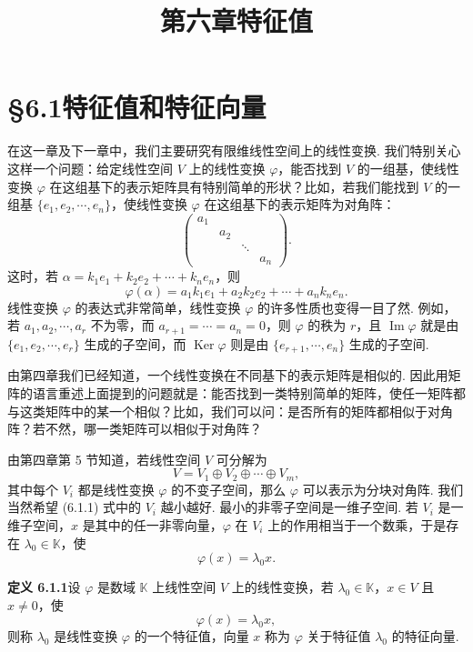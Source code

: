 \documentclass[UTF8, 12pt, fontset=fandol, oneside]{ctexart}
\title{第六章\quad 特征值}
\author{}
\date{}
\begin{document}
\maketitle

\section*{§6.1\quad 特征值和特征向量}

在这一章及下一章中，我们主要研究有限维线性空间上的线性变换. 我们特别关心这样一个问题：给定线性空间 $V$ 上的线性变换 $\varphi$，能否找到 $V$ 的一组基，使线性变换 $\varphi$ 在这组基下的表示矩阵具有特别简单的形状？比如，若我们能找到 $V$ 的一组基 $\{e_1,e_2,\cdots,e_n\}$，使线性变换 $\varphi$ 在这组基下的表示矩阵为对角阵：
\[
\left(\begin{array}{cccc}
a_1 & & & \\
& a_2 & & \\
& & \ddots & \\
& & & a_n
\end{array}\right).
\]
这时，若 $\alpha=k_1e_1+k_2e_2+\cdots+k_ne_n$，则
\[
\varphi(\alpha)=a_1k_1e_1+a_2k_2e_2+\cdots+a_nk_ne_n.
\]
线性变换 $\varphi$ 的表达式非常简单，线性变换 $\varphi$ 的许多性质也变得一目了然. 例如，若 $a_1,a_2,\cdots,a_r$ 不为零，而 $a_{r+1}=\cdots=a_n=0$，则 $\varphi$ 的秩为 $r$，且 $\operatorname{Im}\varphi$ 就是由 $\{e_1,e_2,\cdots,e_r\}$ 生成的子空间，而 $\operatorname{Ker}\varphi$ 则是由 $\{e_{r+1},\cdots,e_n\}$ 生成的子空间.

由第四章我们已经知道，一个线性变换在不同基下的表示矩阵是相似的. 因此用矩阵的语言重述上面提到的问题就是：能否找到一类特别简单的矩阵，使任一矩阵都与这类矩阵中的某一个相似？比如，我们可以问：是否所有的矩阵都相似于对角阵？若不然，哪一类矩阵可以相似于对角阵？

由第四章第 5 节知道，若线性空间 $V$ 可分解为
\begin{equation}
V=V_1\oplus V_2\oplus\cdots\oplus V_m,
\tag{6.1.1}
\end{equation}
其中每个 $V_i$ 都是线性变换 $\varphi$ 的不变子空间，那么 $\varphi$ 可以表示为分块对角阵. 我们当然希望 (6.1.1) 式中的 $V_i$ 越小越好. 最小的非零子空间是一维子空间. 若 $V_i$ 是一维子空间，$x$ 是其中的任一非零向量，$\varphi$ 在 $V_i$ 上的作用相当于一个数乘，于是存在 $\lambda_0\in\mathbb{K}$，使
\[
\varphi(x)=\lambda_0x.
\]

\noindent\textbf{定义 6.1.1}\quad 设 $\varphi$ 是数域 $\mathbb{K}$ 上线性空间 $V$ 上的线性变换，若 $\lambda_0\in\mathbb{K}$，$x\in V$ 且 $x\neq 0$，使
\begin{equation}
\varphi(x)=\lambda_0x,
\tag{6.1.2}
\end{equation}
则称 $\lambda_0$ 是线性变换 $\varphi$ 的一个特征值，向量 $x$ 称为 $\varphi$ 关于特征值 $\lambda_0$ 的特征向量.
\end{document}
